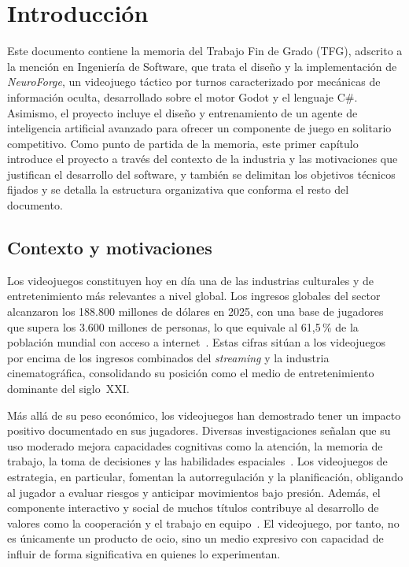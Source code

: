 \chapter{Introducción}

Este documento contiene la memoria del Trabajo Fin de Grado (TFG), adscrito a la mención en Ingeniería de Software, que trata el diseño y la implementación de \textit{NeuroForge}, un videojuego táctico por turnos caracterizado por mecánicas de información oculta, desarrollado sobre el motor Godot y el lenguaje C\#. Asimismo, el proyecto incluye el diseño y entrenamiento de un agente de inteligencia artificial avanzado para ofrecer un componente de juego en solitario competitivo. Como punto de partida de la memoria, este primer capítulo introduce el proyecto a través del contexto de la industria y las motivaciones que justifican el desarrollo del software, y también se delimitan los objetivos técnicos fijados y se detalla la estructura organizativa que conforma el resto del documento.

\section{Contexto y motivaciones}

Los videojuegos constituyen hoy en día una de las industrias culturales y de entretenimiento más relevantes a nivel global. Los ingresos globales del sector alcanzaron los 188.800 millones de dólares en 2025, con una base de jugadores que supera los 3.600 millones de personas, lo que equivale al 61,5\,\% de la población mundial con acceso a internet~\cite{newzoo2025}. Estas cifras sitúan a los videojuegos por encima de los ingresos combinados del \textit{streaming} y la industria cinematográfica, consolidando su posición como el medio de entretenimiento dominante del siglo~XXI.

Más allá de su peso económico, los videojuegos han demostrado tener un impacto positivo documentado en sus jugadores. Diversas investigaciones señalan que su uso moderado mejora capacidades cognitivas como la atención, la memoria de trabajo, la toma de decisiones y las habilidades espaciales~\cite{palaus2020}. Los videojuegos de estrategia, en particular, fomentan la autorregulación y la planificación, obligando al jugador a evaluar riesgos y anticipar movimientos bajo presión. Además, el componente interactivo y social de muchos títulos contribuye al desarrollo de valores como la cooperación y el trabajo en equipo~\cite{garcianaveira2018}. El videojuego, por tanto, no es únicamente un producto de ocio, sino un medio expresivo con capacidad de influir de forma significativa en quienes lo experimentan.

